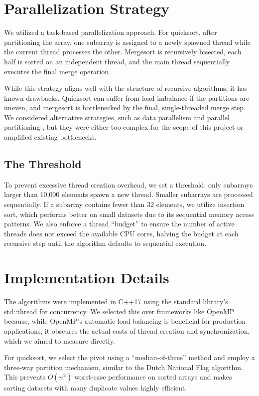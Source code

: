 \documentclass[letterpaper]{article}
\begin{document}
\section{Parallelization Strategy}
We utilized a task-based parallelization approach. For quicksort, after partitioning the array, one subarray is assigned to a newly spawned thread while the current thread processes the other. Mergesort is recursively bisected, each half is sorted on an independent thread, and the main thread sequentially executes the final merge operation. 

While this strategy aligns well with the structure of recursive algorithms, it has known drawbacks. Quicksort can suffer from load imbalance if the partitions are uneven, and mergesort is bottlenecked by the final, single-threaded merge step. We considered alternative strategies, such as data parallelism and parallel partitioning \cite{tsigas}, but they were either too complex for the scope of this project or amplified existing bottlenecks.

\subsection{The Threshold}
To prevent excessive thread creation overhead, we set a threshold: only subarrays larger than 10{,}000 elements spawn a new thread. Smaller subarrays are processed sequentially. If a subarray contains fewer than 32 elements, we utilize insertion sort, which performs better on small datasets due to its sequential memory access patterns. We also enforce a thread ``budget'' to ensure the number of active threads does not exceed the available CPU cores, halving the budget at each recursive step until the algorithm defaults to sequential execution.

\section{Implementation Details}
The algorithms were implemented in C++17 using the standard library's std::thread for concurrency. We selected this over frameworks like OpenMP because, while OpenMP's automatic load balancing is beneficial for production applications, it obscures the actual costs of thread creation and synchronization, which we aimed to measure directly.

For quicksort, we select the pivot using a ``median-of-three'' method and employ a three-way partition mechanism, similar to the Dutch National Flag algorithm. This prevents $O(n^2)$ worst-case performance on sorted arrays and makes sorting datasets with many duplicate values highly efficient.
\end{document}
